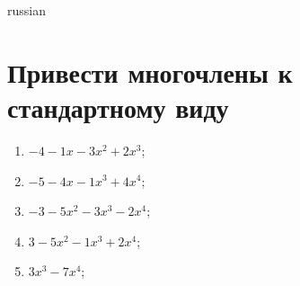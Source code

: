\documentclass[a4paper]{article}
\begin{document}
\begin{otherlanguage*}{russian}

\section{Привести многочлены к стандартному виду}
\begin{enumerate}
\item $-4-1x-3x^2 + 2x^3$;
\item $-5-4x-1x^3 + 4x^4$;
\item $-3-5x^2-3x^3-2x^4$;
\item $3-5x^2-1x^3 + 2x^4$;
\item $3x^3-7x^4$;
\end{enumerate}
\end{otherlanguage*}
\end{document}
